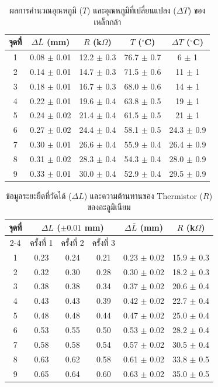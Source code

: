 \documentclass[11pt,a4paper]{article}
\begin{document}
\begin{table}[htbp]
\centering
\caption{ผลการคำนวณอุณหภูมิ ($T$) และอุณหภูมิที่เปลี่ยนแปลง ($\Delta T$) ของเหล็กกล้า}
\renewcommand{\arraystretch}{1.2}
\begin{tabular}{|c|c|c|c|c|}
\hline
จุดที่ 
& $\Delta \bar L$ (mm)
& $R$ (k$\Omega$)
& $T$ ($^\circ$C)
& $\Delta T$ ($^\circ$C) \\
\hline
1 & 0.08 $\pm$ 0.01 & 12.2 $\pm$ 0.3 & 76.7 $\pm$ 0.7 & 6 $\pm$ 1 \\
2 & 0.14 $\pm$ 0.01 & 14.7 $\pm$ 0.3 & 71.5 $\pm$ 0.6 & 11 $\pm$ 1 \\
3 & 0.18 $\pm$ 0.01 & 16.7 $\pm$ 0.3 & 68.0 $\pm$ 0.6 & 14 $\pm$ 1 \\
4 & 0.22 $\pm$ 0.01 & 19.6 $\pm$ 0.4 & 63.8 $\pm$ 0.5 & 19 $\pm$ 1 \\
5 & 0.24 $\pm$ 0.02 & 21.4 $\pm$ 0.4 & 61.5 $\pm$ 0.5 & 21 $\pm$ 1 \\
6 & 0.27 $\pm$ 0.02 & 24.4 $\pm$ 0.4 & 58.1 $\pm$ 0.5 & 24.3 $\pm$ 0.9 \\
7 & 0.30 $\pm$ 0.01 & 26.6 $\pm$ 0.4 & 55.9 $\pm$ 0.4 & 26.4 $\pm$ 0.9 \\
8 & 0.31 $\pm$ 0.02 & 28.3 $\pm$ 0.4 & 54.3 $\pm$ 0.4 & 28.0 $\pm$ 0.9 \\
9 & 0.33 $\pm$ 0.01 & 30.0 $\pm$ 0.4 & 52.9 $\pm$ 0.4 & 29.5 $\pm$ 0.9 \\
\hline
\end{tabular}
\end{table}



\begin{table}[htbp]
\centering
\caption{ข้อมูลระยะยืดที่วัดได้ ($\Delta L$) และความต้านทานของ Thermistor ($R$) ของอะลูมิเนียม}
\renewcommand{\arraystretch}{1.2}
\begin{tabular}{|c|ccc|c|c|}
\hline
จุดที่ 
& \multicolumn{3}{c|}{$\Delta L$ ($\pm 0.01$ mm)} 
& $\Delta \bar L$ (mm)
& $R$ (k$\Omega$) \\
\cline{2-4}
& ครั้งที่ 1 & ครั้งที่ 2 & ครั้งที่ 3 & & \\
\hline
1 & 0.23 & 0.24 & 0.21 & 0.23 $\pm$ 0.02 & 15.9 $\pm$ 0.3 \\
2 & 0.32 & 0.30 & 0.28 & 0.30 $\pm$ 0.02 & 18.2 $\pm$ 0.3 \\
3 & 0.38 & 0.38 & 0.34 & 0.37 $\pm$ 0.02 & 20.6 $\pm$ 0.4 \\
4 & 0.43 & 0.43 & 0.39 & 0.42 $\pm$ 0.02 & 22.7 $\pm$ 0.4 \\
5 & 0.48 & 0.48 & 0.44 & 0.47 $\pm$ 0.02 & 25.0 $\pm$ 0.4 \\
6 & 0.53 & 0.55 & 0.50 & 0.53 $\pm$ 0.02 & 28.2 $\pm$ 0.4 \\
7 & 0.58 & 0.58 & 0.54 & 0.57 $\pm$ 0.02 & 30.5 $\pm$ 0.4 \\
8 & 0.63 & 0.62 & 0.58 & 0.61 $\pm$ 0.02 & 33.8 $\pm$ 0.5 \\
9 & 0.65 & 0.64 & 0.60 & 0.63 $\pm$ 0.02 & 35.0 $\pm$ 0.5 \\
\hline
\end{tabular}
\end{table}
\end{document}
